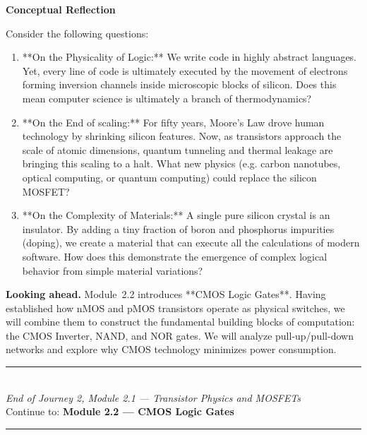 \documentclass[12pt, a4paper]{book}
\begin{document}
\begin{reflectionbox}
\textbf{Conceptual Reflection}

Consider the following questions:
\begin{enumerate}
  \item **On the Physicality of Logic:** We write code in highly abstract languages. Yet, every line of code is ultimately executed by the movement of electrons forming inversion channels inside microscopic blocks of silicon. Does this mean computer science is ultimately a branch of thermodynamics?
  \item **On the End of scaling:** For fifty years, Moore's Law drove human technology by shrinking silicon features. Now, as transistors approach the scale of atomic dimensions, quantum tunneling and thermal leakage are bringing this scaling to a halt. What new physics (e.g. carbon nanotubes, optical computing, or quantum computing) could replace the silicon MOSFET?
  \item **On the Complexity of Materials:** A single pure silicon crystal is an insulator. By adding a tiny fraction of boron and phosphorus impurities (doping), we create a material that can execute all the calculations of modern software. How does this demonstrate the emergence of complex logical behavior from simple material variations?
\end{enumerate}
\end{reflectionbox}

\medskip
\noindent\textbf{Looking ahead.}
Module~2.2 introduces **CMOS Logic Gates**. Having established how nMOS and pMOS transistors operate as physical switches, we will combine them to construct the fundamental building blocks of computation: the CMOS Inverter, NAND, and NOR gates. We will analyze pull-up/pull-down networks and explore why CMOS technology minimizes power consumption.

\vspace{1.4cm}
\begin{center}
{\color{JourneyColor}\rule{0.5\linewidth}{0.8pt}}\\[6pt]
{\small\color{JourneyColor}\textit{End of Journey 2, Module 2.1 --- Transistor Physics and MOSFETs}}\\[4pt]
{\small\color{JourneyColor}Continue to: \textbf{Module 2.2 --- CMOS Logic Gates}}\\[6pt]
{\color{JourneyColor}\rule{0.5\linewidth}{0.8pt}}
\end{center}
\end{document}
